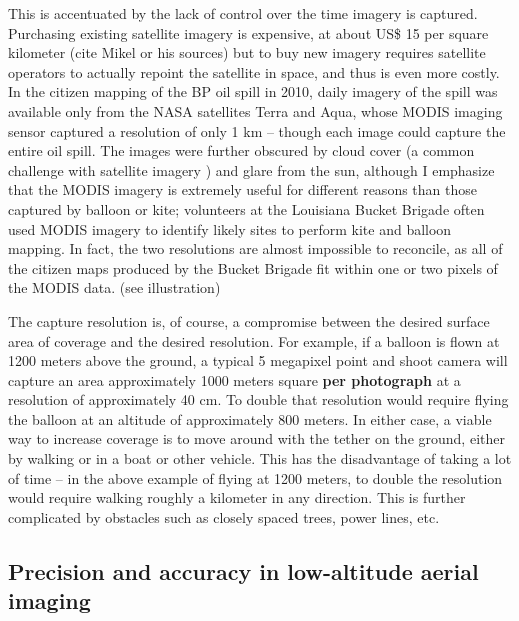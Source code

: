 \documentclass[11pt]{report}
\begin{document}
This is accentuated by the lack of control over the time imagery is captured. Purchasing existing satellite imagery is expensive, at about US\$ 15 per square kilometer (cite Mikel or his sources) but to buy new imagery requires satellite operators to actually repoint the satellite in space, and thus is even more costly. In the citizen mapping of the BP oil spill in 2010, daily imagery of the spill was available only from the NASA satellites Terra and Aqua, whose MODIS imaging sensor captured a resolution of only 1 km -- though each image could capture the entire oil spill. The images were further obscured by cloud cover (a common challenge with satellite imagery \cite{miyamoto2004use}) and glare from the sun, although I emphasize that the MODIS imagery is extremely useful for different reasons than those captured by balloon or kite; volunteers at the Louisiana Bucket Brigade often used MODIS imagery to identify likely sites to perform kite and balloon mapping. In fact, the two resolutions are almost impossible to reconcile, as all of the citizen maps produced by the Bucket Brigade fit within one or two pixels of the MODIS data. (see illustration)


The capture resolution is, of course, a compromise between the desired surface area of coverage and the desired resolution. For example, if a balloon is flown at 1200 meters above the ground, a typical 5 megapixel point and shoot camera will capture an area approximately 1000 meters square \textbf{per photograph} at a resolution of approximately 40 cm. To double that resolution would require flying the balloon at an altitude of approximately 800 meters. In either case, a viable way to increase coverage is to move around with the tether on the ground, either by walking or in a boat or other vehicle. This has the disadvantage of taking a lot of time -- in the above example of flying at 1200 meters, to double the resolution would require walking roughly a kilometer in any direction. This is further complicated by obstacles such as closely spaced trees, power lines, etc.

\subsection{Precision and accuracy in low-altitude aerial imaging}
\end{document}
